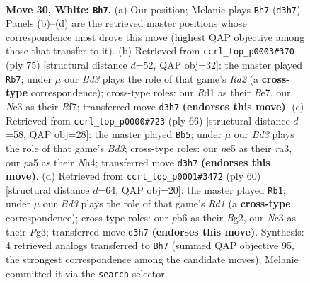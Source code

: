 \documentclass[11pt]{article}
\begin{document}
\clearpage

\begin{figure}[p]\centering
\begin{subfigure}{0.46\textwidth}\centering
\resizebox{\linewidth}{!}{%
\newchessgame
\chessboard[
  setfen={r7/3bk3/1p2p3/p3n3/P5r1/1PNB2P1/5K2/R2R4 w - - 0 30},
  showmover=false,
  pgfstyle=straightmove, color=movearrow, markmove={d3-h7}
]}
\caption{}
\end{subfigure}\hfill
\begin{subfigure}{0.46\textwidth}\centering
\resizebox{\linewidth}{!}{%
\newchessgame
\chessboard[
  setfen={6k1/3rbr2/4p2p/p4p2/B2n1PP1/6N1/R5PK/5R2 b - - 0 38},
  showmover=false,
  pgfstyle=straightmove, color=movearrow, markmove={d7-b7}
]}
\caption{}
\end{subfigure}
\\[4pt]
\begin{subfigure}{0.46\textwidth}\centering
\resizebox{\linewidth}{!}{%
\newchessgame
\chessboard[
  setfen={6k1/5p2/1p2bn2/4p3/r3P1PN/r2B1P2/8/1R1R2K1 w - - 0 34},
  showmover=false,
  pgfstyle=straightmove, color=movearrow, markmove={d3-b5}
]}
\caption{}
\end{subfigure}\hfill
\begin{subfigure}{0.46\textwidth}\centering
\resizebox{\linewidth}{!}{%
\newchessgame
\chessboard[
  setfen={6k1/2rp3p/4p3/5rp1/b1PR4/6PP/5PB1/3R2K1 w - - 2 31},
  showmover=false,
  pgfstyle=straightmove, color=movearrow, markmove={d1-b1}
]}
\caption{}
\end{subfigure}
\caption{\textbf{Move 30, White: \texttt{Bh7}.} (a) Our position; Melanie plays \texttt{Bh7} (\texttt{d3h7}). Panels (b)--(d) are the retrieved master positions whose correspondence most drove this move (highest QAP objective among those that transfer to it). (b) Retrieved from \texttt{ccrl\_top\_p0003\#370} (ply 75) [structural distance $d$=52, QAP obj=32]: the master played \texttt{Rb7}; under $\mu$ our \emph{Bd3} plays the role of that game's \emph{Rd2} (a \textbf{cross-type} correspondence); cross-type roles: our \emph{R}d1 as their \emph{B}e7, our \emph{N}c3 as their \emph{R}f7; transferred move \texttt{d3h7} \textbf{(endorses this move)}. (c) Retrieved from \texttt{ccrl\_top\_p0000\#723} (ply 66) [structural distance $d$=58, QAP obj=28]: the master played \texttt{Bb5}; under $\mu$ our \emph{Bd3} plays the role of that game's \emph{Bd3}; cross-type roles: our \emph{n}e5 as their \emph{r}a3, our \emph{p}a5 as their \emph{N}h4; transferred move \texttt{d3h7} \textbf{(endorses this move)}. (d) Retrieved from \texttt{ccrl\_top\_p0001\#3472} (ply 60) [structural distance $d$=64, QAP obj=20]: the master played \texttt{Rb1}; under $\mu$ our \emph{Bd3} plays the role of that game's \emph{Rd1} (a \textbf{cross-type} correspondence); cross-type roles: our \emph{p}b6 as their \emph{B}g2, our \emph{N}c3 as their \emph{P}g3; transferred move \texttt{d3h7} \textbf{(endorses this move)}. Synthesis: 4 retrieved analogs transferred to \texttt{Bh7} (summed QAP objective 95, the strongest correspondence among the candidate moves); Melanie committed it via the \texttt{search} selector.}
\label{fig:thought-m58}
\end{figure}
\end{document}
